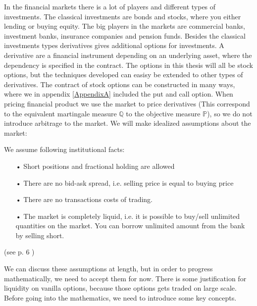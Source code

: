 In the financial markets there is a lot of players and different types of investments. The classical investments are bonds and stocks, where you either lending or buying equity. The big players in the markets are commercial banks, investment banks, insurance companies and pension funds. Besides the classical investments types derivatives gives additional options for investments. A derivative are a financial instrument depending on an underlying asset, where the dependency is specified in the contract. The options in this thesis will all be stock options, but the techniques developed can easisy be extended to other types of derivatives. The contract of stock options can be constructed in many ways, where we in appendix \ref{AppendixA} included the put and call option. When pricing financial product we use the market to price derivatives (This correspond to the equivalent martingale measure $\mathbb{Q}$ to the objective measure $\mathbb{P}$), so we do not introduce arbitrage to the market. We will make idealized assumptions about the market:
\theoremstyle{assumption}
\begin{assumption}{}\label{EfficientMarket}
We assume following institutional facts:
\begin{enumerate}
\item[•] Short positions and fractional holding are allowed 
\item[•] There are no bid-ask spread, i.e. selling price is equal to buying price
\item[•] There are no transactions costs of trading.
\item[•] The market is completely liquid, i.e. it is possible to buy/sell unlimited quantities on the market. You can borrow unlimited amount from the bank by selling short.
\end{enumerate}
(see p. 6 \parencite{finKont})
\end{assumption}
We can discuss these assumptions at length, but in order to progress mathematically, we need to accept them for now. There is some justification for liquidity on vanilla options, because those options gets traded on large scale. Before going into the mathematics, we need to introduce some key concepts.

